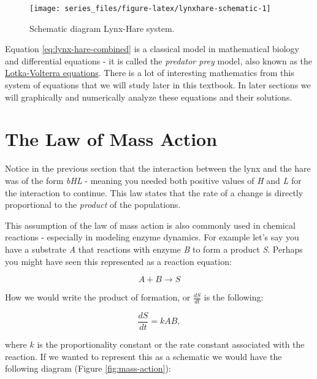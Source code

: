 \documentclass[
]{book}
\theoremstyle{definition}
\theoremstyle{definition}
\theoremstyle{definition}
\theoremstyle{remark}
\begin{document}
\begin{figure}

{\centering \texttt{[image: series\_files/figure-latex/lynxhare-schematic-1]} 

}

\caption{Schematic diagram Lynx-Hare system.}\label{fig:lynxhare-schematic}
\end{figure}

Equation \eqref{eq:lynx-hare-combined} is a classical model in mathematical biology and differential equations - it is called the \emph{predator prey} model, also known as the \href{https://en.wikipedia.org/wiki/Lotka\%E2\%80\%93Volterra_equations}{Lotka-Volterra equations}. There is a lot of interesting mathematics from this system of equations that we will study later in this textbook. In later sections we will graphically and numerically analyze these equations and their solutions.

\hypertarget{the-law-of-mass-action}{%
\section{The Law of Mass Action}\label{the-law-of-mass-action}}

Notice in the previous section that the interaction between the lynx and the hare was of the form \emph{bHL} - meaning you needed both positive values of \emph{H} and \emph{L} for the interaction to continue. This law states that the rate of a change is directly proportional to the \emph{product} of the populations.

This assumption of the law of mass action is also commonly used in chemical reactions - especially in modeling enzyme dynamics. For example let's say you have a substrate \emph{A} that reactions with enzyme \emph{B} to form a product \emph{S}. Perhaps you might have seen this represented as a reaction equation:

\begin{equation}
A+B \rightarrow S
\end{equation}

How we would write the product of formation, or \(\displaystyle \frac{dS}{dt}\) is the following:

\begin{equation}
\frac{dS}{dt}= kAB,
\end{equation}

where \(k\) is the proportionality constant or the rate constant associated with the reaction. If we wanted to represent this as a schematic we would have the following diagram (Figure \ref{fig:mass-action}):
\end{document}
